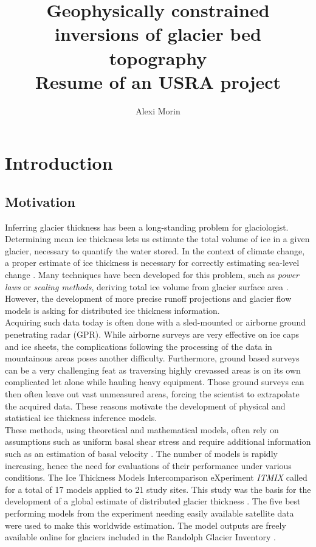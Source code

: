 \documentclass[a4, 12pt]{article}
\title{Geophysically constrained inversions of glacier bed topography \\
 \large Resume of an USRA project}
\author{Alexi Morin}
\newcommand{\citeg}[1]{\citep[e.g.][]{#1}}
\begin{document}
\maketitle
\section{Introduction}
\subsection{Motivation}
Inferring glacier thickness has been a long-standing problem for glaciologist. Determining mean ice thickness lets us estimate the total volume of ice in a given glacier, necessary to quantify the water stored. In the context of climate change, a proper estimate of ice thickness is necessary for correctly estimating sea-level change \citeg{farinotti2016accurate}. Many techniques have been developed for this problem, such as \textit{power laws} or \textit{scaling methods}, deriving total ice volume from glacier surface area \citep[e.g.][]{bahr2015review}. However, the development of more precise runoff projections \citeg{ramsankaran2018spatially} and glacier flow models \citeg{werder2020bayesian} is asking for distributed ice thickness information.\\

Acquiring such data today is often done with a sled-mounted or airborne ground penetrating radar (GPR). While airborne surveys are very effective on ice caps and ice sheets, the complications following the processing of the data in mountainous areas poses another difficulty. Furthermore, ground based surveys can  be a very challenging feat as traversing highly crevassed areas is on its own complicated let alone while hauling heavy equipment. \citeg{colombero2019ice} Those ground surveys can then often leave out vast unmeasured areas, forcing the scientist to extrapolate the acquired data. These reasons motivate the development of physical and statistical ice thickness inference models. \\

These methods, using theoretical and mathematical models, often rely on assumptions such as uniform basal shear stress and require additional information such as an estimation of basal velocity \citeg{farinotti2016accurate}. The number of models is rapidly increasing, hence the need for evaluations of their performance under various conditions. The Ice Thickness Models Intercomparison eXperiment \citeg{farinotti2016accurate} \textit{ITMIX} called for a total of 17 models applied to 21 study sites. This study was the basis for the development of a global estimate of distributed glacier thickness \citeg{farinotti2019consensus}. The five best performing models from the experiment needing easily available satellite data were used to make this worldwide estimation. The model outputs are freely available online for glaciers included in the Randolph Glacier Inventory \citeg{pfeffer2014randolph}.\\
\end{document}
